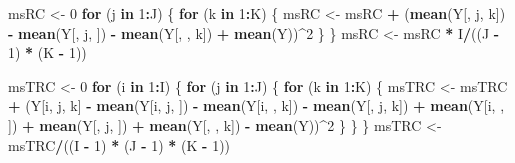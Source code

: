 \documentclass[
]{book}
\newenvironment{Shaded}{\begin{snugshade}}{\end{snugshade}}
\newcommand{\ControlFlowTok}[1]{\textcolor[rgb]{0.13,0.29,0.53}{\textbf{#1}}}
\newcommand{\DecValTok}[1]{\textcolor[rgb]{0.00,0.00,0.81}{#1}}
\newcommand{\KeywordTok}[1]{\textcolor[rgb]{0.13,0.29,0.53}{\textbf{#1}}}
\newcommand{\NormalTok}[1]{#1}
\newcommand{\OperatorTok}[1]{\textcolor[rgb]{0.81,0.36,0.00}{\textbf{#1}}}
\newcommand{\StringTok}[1]{\textcolor[rgb]{0.31,0.60,0.02}{#1}}
\begin{document}
\begin{Shaded}
\begin{Highlighting}[]
\NormalTok{msRC \textless{}{-}}\StringTok{ }\DecValTok{0}
\ControlFlowTok{for}\NormalTok{ (j }\ControlFlowTok{in} \DecValTok{1}\OperatorTok{:}\NormalTok{J) \{}
  \ControlFlowTok{for}\NormalTok{ (k }\ControlFlowTok{in} \DecValTok{1}\OperatorTok{:}\NormalTok{K) \{}
\NormalTok{    msRC \textless{}{-}}\StringTok{ }\NormalTok{msRC }\OperatorTok{+}\StringTok{ }
\StringTok{      }\NormalTok{(}\KeywordTok{mean}\NormalTok{(Y[, j, k]) }\OperatorTok{{-}}\StringTok{ }\KeywordTok{mean}\NormalTok{(Y[, j, ]) }\OperatorTok{{-}}\StringTok{ }\KeywordTok{mean}\NormalTok{(Y[, , k]) }\OperatorTok{+}\StringTok{ }\KeywordTok{mean}\NormalTok{(Y))}\OperatorTok{\^{}}\DecValTok{2}
\NormalTok{  \}}
\NormalTok{\}}
\NormalTok{msRC \textless{}{-}}\StringTok{ }\NormalTok{msRC }\OperatorTok{*}\StringTok{ }\NormalTok{I}\OperatorTok{/}\NormalTok{((J }\OperatorTok{{-}}\StringTok{ }\DecValTok{1}\NormalTok{) }\OperatorTok{*}\StringTok{ }\NormalTok{(K }\OperatorTok{{-}}\StringTok{ }\DecValTok{1}\NormalTok{))}

\NormalTok{msTRC \textless{}{-}}\StringTok{ }\DecValTok{0}
\ControlFlowTok{for}\NormalTok{ (i }\ControlFlowTok{in} \DecValTok{1}\OperatorTok{:}\NormalTok{I) \{}
  \ControlFlowTok{for}\NormalTok{ (j }\ControlFlowTok{in} \DecValTok{1}\OperatorTok{:}\NormalTok{J) \{}
    \ControlFlowTok{for}\NormalTok{ (k }\ControlFlowTok{in} \DecValTok{1}\OperatorTok{:}\NormalTok{K) \{}
\NormalTok{      msTRC \textless{}{-}}\StringTok{ }\NormalTok{msTRC }\OperatorTok{+}\StringTok{ }\NormalTok{(Y[i, j, k] }\OperatorTok{{-}}\StringTok{ }\KeywordTok{mean}\NormalTok{(Y[i, j, ]) }\OperatorTok{{-}}\StringTok{ }
\StringTok{                          }\KeywordTok{mean}\NormalTok{(Y[i, , k]) }\OperatorTok{{-}}\StringTok{ }\KeywordTok{mean}\NormalTok{(Y[, j, k]) }\OperatorTok{+}\StringTok{ }
\StringTok{                          }\KeywordTok{mean}\NormalTok{(Y[i, , ]) }\OperatorTok{+}\StringTok{ }\KeywordTok{mean}\NormalTok{(Y[, j, ]) }\OperatorTok{+}\StringTok{ }
\StringTok{                          }\KeywordTok{mean}\NormalTok{(Y[, , k]) }\OperatorTok{{-}}\StringTok{ }\KeywordTok{mean}\NormalTok{(Y))}\OperatorTok{\^{}}\DecValTok{2}
\NormalTok{    \}}
\NormalTok{  \}}
\NormalTok{\}}
\NormalTok{msTRC \textless{}{-}}\StringTok{ }\NormalTok{msTRC}\OperatorTok{/}\NormalTok{((I }\OperatorTok{{-}}\StringTok{ }\DecValTok{1}\NormalTok{) }\OperatorTok{*}\StringTok{ }\NormalTok{(J }\OperatorTok{{-}}\StringTok{ }\DecValTok{1}\NormalTok{) }\OperatorTok{*}\StringTok{ }\NormalTok{(K }\OperatorTok{{-}}\StringTok{ }\DecValTok{1}\NormalTok{))}


\end{Highlighting}
\end{Shaded}
\end{document}
